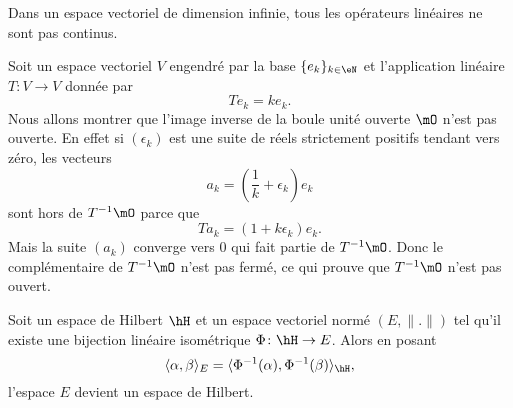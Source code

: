 Dans un espace vectoriel de dimension infinie, tous les opérateurs linéaires ne sont pas continus.

\begin{example}
	Soit un espace vectoriel \( V\) engendré par la base \( \{ e_k \}_{k\in \eN}\) et l'application linéaire \( T\colon V\to V\) donnée par
	\begin{equation}
		Te_k=ke_k.
	\end{equation}
	Nous allons montrer que l'image inverse de la boule unité ouverte \( \mO\) n'est pas ouverte. En effet si \( (\epsilon_k)\) est une suite de réels strictement positifs tendant vers zéro, les vecteurs
	\begin{equation}
		a_k=\left( \frac{1}{ k }+\epsilon_k \right)e_k
	\end{equation}
	sont hors de \( T^{-1}\mO\) parce que
	\begin{equation}
		Ta_k=(1+k\epsilon_k)e_k.
	\end{equation}
	Mais la suite \( (a_k)\) converge vers \( 0\) qui fait partie de \( T^{-1}\mO\). Donc le complémentaire de \( T^{-1}\mO\) n'est pas fermé, ce qui prouve que \( T^{-1}\mO\) n'est pas ouvert.
\end{example}

\begin{proposition}      \label{PROPooMSAYooONHLYq}
	Soit un espace de Hilbert \( \hH\) et un espace vectoriel normé \( (E,\| . \|)\) tel qu'il existe une bijection linéaire isométrique \( \Phi\colon \hH\to E\). Alors en posant
	\begin{equation}
		\langle \alpha, \beta\rangle_E =\langle \Phi^{-1}(\alpha), \Phi^{-1}(\beta)\rangle_{\hH} ,
	\end{equation}
	l'espace \( E\) devient un espace de Hilbert.
\end{proposition}

